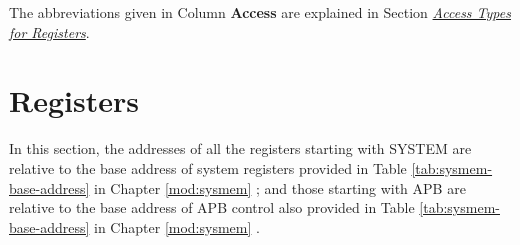\documentclass[main\_\_EN.tex]{subfiles}
\begin{document}
The abbreviations given in Column \textbf{Access} are explained in Section \hyperref[glossary-access-types]{\textit{Access Types for Registers}}.





\clearpage
\section{Registers}

In this section, the addresses of all the registers starting with SYSTEM are relative to the base address of system registers provided in Table \ref{tab:sysmem-base-address} in Chapter \ref{mod:sysmem} \textit{}; and those starting with APB are relative to the base address of APB control also provided in Table \ref{tab:sysmem-base-address} in Chapter \ref{mod:sysmem} \textit{}.



\end{document}

